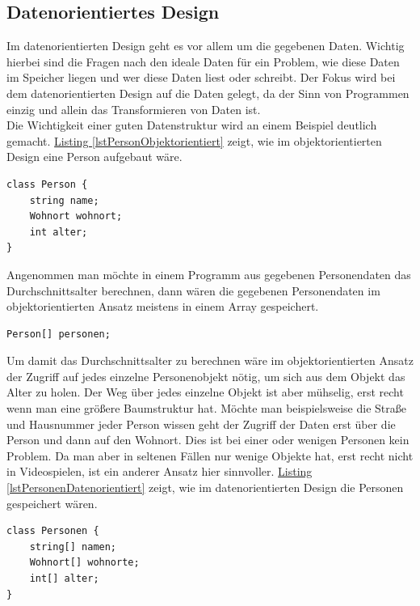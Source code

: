 \subsection{Datenorientiertes Design}
Im datenorientierten Design geht es vor allem um die gegebenen Daten. Wichtig hierbei sind die Fragen nach den ideale Daten für ein Problem, wie diese Daten im Speicher liegen und wer diese Daten liest oder schreibt. Der Fokus wird bei dem datenorientierten Design auf die Daten gelegt, da der Sinn von Programmen einzig und allein das Transformieren von Daten ist.\\
Die Wichtigkeit einer guten Datenstruktur wird an einem Beispiel deutlich gemacht. \hyperref[lstPersonObjektorientiert]{Listing \ref*{lstPersonObjektorientiert}} zeigt, wie im objektorientierten Design eine Person aufgebaut wäre.
\begin{lstlisting}[style=code, caption={[Person im objektorientierten Design]Person im objektorientierten Design. Objekte sind im objektorientierten Design oft Baumstrukturen, erkennbar an dem Unterobjekt \texttt{wohnort}.}, label=lstPersonObjektorientiert]
class Person {
    string name;
    Wohnort wohnort;
    int alter;
}
\end{lstlisting}
Angenommen man möchte in einem Programm aus gegebenen Personendaten das Durchschnittsalter berechnen, dann wären die gegebenen Personendaten im objektorientierten Ansatz meistens in einem Array gespeichert.
\begin{lstlisting}[style=code]
Person[] personen;
\end{lstlisting}
Um damit das Durchschnittsalter zu berechnen wäre im objektorientierten Ansatz der Zugriff auf jedes einzelne Personenobjekt nötig, um sich aus dem Objekt das Alter zu holen. Der Weg über jedes einzelne Objekt ist aber mühselig, erst recht wenn man eine größere Baumstruktur hat. Möchte man beispielsweise die Straße und Hausnummer jeder Person wissen geht der Zugriff der Daten erst über die Person und dann auf den Wohnort. Dies ist bei einer oder wenigen Personen kein Problem. Da man aber in seltenen Fällen nur wenige Objekte hat, erst recht nicht in Videospielen, ist ein anderer Ansatz hier sinnvoller. \hyperref[lstPersonenDatenorientiert]{Listing \ref*{lstPersonenDatenorientiert}} zeigt, wie im datenorientierten Design die Personen gespeichert wären.
\begin{lstlisting}[style=code, caption={[Personen im datenorientierten Design]Personen im datenorientierten Design. Die Objekte werden in ihre einzelnen Komponenten zerlegt, welche dann in Arrays gespeichert werden.}, label=lstPersonenDatenorientiert]
class Personen {
    string[] namen;
    Wohnort[] wohnorte;
    int[] alter;
}
\end{lstlisting}
